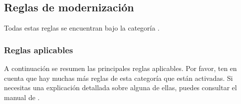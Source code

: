 \subsection{Reglas de modernización}

Todas estas reglas se encuentran bajo la categoría .

\subsubsection{Reglas aplicables}

A continuación se resumen las principales reglas aplicables. Por favor, ten en cuenta que hay muchas más
reglas de esta categoría que están activadas. Si necesitas una explicación detallada sobre alguna de ellas,
puedes consultar el manual de .

